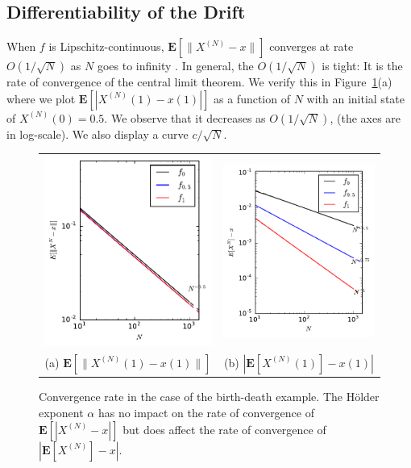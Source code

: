 \documentclass[sigconf]{acmart}
\newcommand\XN{X^{(N)}}
\newcommand\sesp[1]{\mathbf{E}[#1]}
\newcommand\snorm[1]{\|#1\|}
\begin{document}
\subsection{Differentiability of the Drift}
\label{sec:BD}

When $f$ is Lipschitz-continuous, $\sesp{\snorm{\XN-x}}$ converges at
rate $O(1/\sqrt{N})$ as $N$ goes to infinity
\cite{benaim2008class,kurtz70}. In general, the $O(1/\sqrt{N})$ is
tight: It is the rate of convergence of the central limit theorem. We
verify this in Figure~\ref{fig:rate_fL-f2}(a) where we plot
$\sesp{|\XN(1)-x(1)|}$ as a function of $N$ with an initial state of
$\XN(0)=0.5$. We observe that it decreases as $O(1/\sqrt{N})$, (the
axes are in log-scale). We also display a curve $c/\sqrt{N}$.

\begin{figure}[ht]
  \centering
  \begin{tabular}{@{}c@{}c@{}}
    \includegraphics[width=.5\linewidth]{rate_birthRate_norm2}
    &\includegraphics[width=.5\linewidth]{rate_birthRate}\\
    (a) $\sesp{\snorm{\XN(1)-x(1)}}$ & (b) $|\sesp{\XN(1)}-x(1)|$
  \end{tabular}
  \caption{Convergence rate in the case of the birth-death
    example. The Hölder exponent $\alpha$ has no impact on the rate of
    convergence of $\sesp{|\XN-x|}$ but does affect the rate of
    convergence of $|\sesp{\XN}-x|$.}
  \label{fig:rate_fL-f2}
\end{figure}
\end{document}
